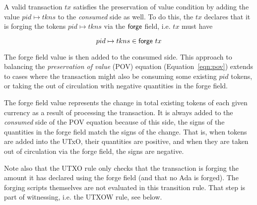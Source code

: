 A valid transaction $tx$ satisfies the preservation of value
condition by adding the value $pid \mapsto tkns$ to the \textit{consumed} side as well.
To do this, the $tx$ declares that it is forging the tokens $pid \mapsto tkns$
via the $\mathsf{forge}$ field, i.e. $tx$ must have

\[pid \mapsto tkns\in\mathsf{forge}~tx\]

The forge field value is then added to the consumed side. This approach
to balancing the \emph{preservation of value} (POV) equation (Equation~\ref{eqn:pov}) extends
to cases where the transaction might also be consuming some existing $pid$ tokens,
or taking the out of circulation with negative quantities in the forge field.

The forge field value represents the change in total existing tokens of each given currency
as a result of processing the transaction. It is always added to the
\textit{consumed} side of the POV equation because of this side, the signs of the
quantities in the forge field match the signs of the change. That is,
when tokens are added into the UTxO, their quantities are positive, and when they are
taken out of circulation via the forge field, the signs are negative.

Note also that the UTXO rule only checks that the transaction is forging the
amount it has declared using the forge field (and that no Ada is forged).
The forging scripts themselves are not evaluated in this transition rule.
That step is part of witnessing, i.e. the UTXOW rule, see below.

